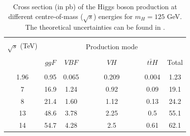 \begin{table}[ht]
	{\setlength{\tabcolsep}{14pt}
		\caption[Cross section (in pb) of the Higgs boson production at different centre-of-mass ($\sqrt{s}$) energies for $m_H=125$ GeV. The theoretical uncertainties can be found in the reference.]{Cross section (in pb) of the Higgs boson production at different centre-of-mass ($\sqrt{s}$) energies for $m_H=125$ GeV. The theoretical uncertainties can be found in \cite{pdg}.}
		\begin{center}
			\vspace{-6mm}
			\begin{tabular}{cccccc}
				\hline \\[-2.45ex] \hline \\[-2.1ex]
				$\sqrt{s}$ (TeV) &&&Production mode&&\\
				\hline \\[-1.8ex]
				& $ggF$ & $VBF$ & $VH$ & $t\bar tH$ & Total \\
				\hline \\[-1.8ex]
                1.96 & 0.95 & 0.065 & 0.209 & 0.004 & 1.23 \\
                7 & 16.9 & 1.24 & 0.92 & 0.09 & 19.1 \\
                8 & 21.4 & 1.60 & 1.12 & 0.13 & 24.2 \\
                13 & 48.6 & 3.78 & 2.25 & 0.5 & 55.1 \\
                14 & 54.7 & 4.28 & 2.5 & 0.61 & 62.1 \\
				\hline
			\end{tabular}
			\vspace{-6mm}
		\end{center}
		\label{HiggsxsecTable}}
\end{table}

